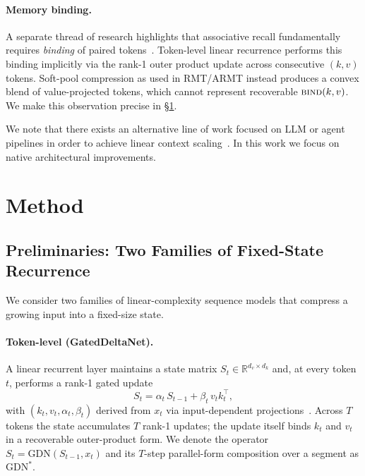 \documentclass[11pt]{article}
\begin{document}
\paragraph{Memory binding.}
A separate thread of research highlights that associative recall fundamentally requires \emph{binding} of paired tokens~\citep{schlag2021linear, ba2016fastweights, hopfield2020modern}. Token-level linear recurrence performs this binding implicitly via the rank-1 outer product update across consecutive $(k, v)$ tokens. Soft-pool compression as used in RMT/ARMT instead produces a convex blend of value-projected tokens, which cannot represent recoverable $\textsc{bind}(k, v)$. We make this observation precise in \S\ref{sec:method}.

We note that there exists an alternative line of work focused on LLM or agent pipelines in order to achieve linear context scaling~\citep{packer2023memgpt, gao2024memorybank}. In this work we focus on native architectural improvements.


\section{Method}
\label{sec:method}

\subsection{Preliminaries: Two Families of Fixed-State Recurrence}

We consider two families of linear-complexity sequence models that compress a growing input into a fixed-size state.

\paragraph{Token-level (GatedDeltaNet).} A linear recurrent layer maintains a state matrix $S_t \in \mathbb{R}^{d_v \times d_k}$ and, at every token $t$, performs a rank-1 gated update
\begin{equation}
    S_t = \alpha_t \, S_{t-1} + \beta_t \, v_t k_t^\top,
    \label{eq:gdn}
\end{equation}
with $(k_t, v_t, \alpha_t, \beta_t)$ derived from $x_t$ via input-dependent projections~\citep{yang2024gateddeltanet}. Across $T$ tokens the state accumulates $T$ rank-1 updates; the update itself binds $k_t$ and $v_t$ in a recoverable outer-product form. We denote the operator $S_t = \mathrm{GDN}(S_{t-1}, x_t)$ and its $T$-step parallel-form composition over a segment as $\mathrm{GDN}^*$.
\end{document}
